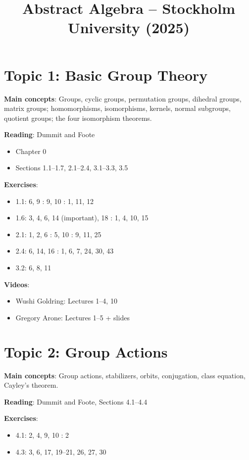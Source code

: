\documentclass[12pt]{article}
\title{\textbf{Abstract Algebra – Stockholm University (2025)}}
\author{}
\date{}
\begin{document}
\maketitle

\section{Topic 1: Basic Group Theory}
\textbf{Main concepts}: Groups, cyclic groups, permutation groups, dihedral groups, matrix groups; homomorphisms, isomorphisms, kernels, normal subgroups, quotient groups; the four isomorphism theorems.

\textbf{Reading}: Dummit and Foote
\begin{itemize}
    \item Chapter 0
    \item Sections 1.1–1.7, 2.1–2.4, 3.1–3.3, 3.5
\end{itemize}

\textbf{Exercises}:
\begin{itemize}
    \item 1.1: 6, 9 : 9, 10 : 1, 11, 12
    \item 1.6: 3, 4, 6, 14 (important), 18 : 1, 4, 10, 15
    \item 2.1: 1, 2, 6 : 5, 10 : 9, 11, 25
    \item 2.4: 6, 14, 16 : 1, 6, 7, 24, 30, 43
    \item 3.2: 6, 8, 11
\end{itemize}

\textbf{Videos}:
\begin{itemize}
    \item Wushi Goldring: Lectures 1–4, 10
    \item Gregory Arone: Lectures 1–5 + slides
\end{itemize}

\section{Topic 2: Group Actions}
\textbf{Main concepts}: Group actions, stabilizers, orbits, conjugation, class equation, Cayley’s theorem.

\textbf{Reading}: Dummit and Foote, Sections 4.1–4.4

\textbf{Exercises}:
\begin{itemize}
    \item 4.1: 2, 4, 9, 10 : 2
    \item 4.3: 3, 6, 17, 19–21, 26, 27, 30
\end{itemize}
\end{document}
